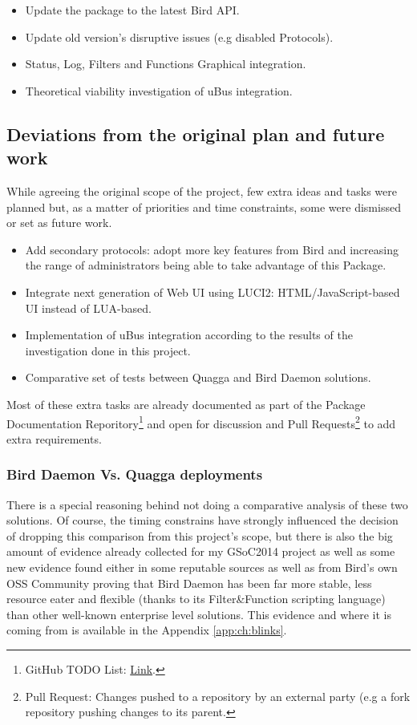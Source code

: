 \begin{itemize}
    \item Update the package to the latest Bird API.
    \item Update old version's disruptive issues (e.g disabled Protocols).
    \item Status, Log, Filters and Functions Graphical integration.
    \item Theoretical viability investigation of uBus integration.
\end{itemize}


\subsection{Deviations from the original plan and future  work}
While agreeing the original scope of the project, few extra ideas and tasks were planned but, as a matter of priorities and time constraints, some were dismissed or set as future work.

\begin{itemize}
    \item Add secondary protocols: adopt more key features from Bird and increasing the range of administrators being able to take advantage of this Package.
    \item Integrate next generation of Web UI using LUCI2: HTML/JavaScript-based UI instead of LUA-based.
    \item Implementation of uBus integration according to the results of the investigation done in this project.
    \item Comparative set of tests between Quagga and Bird Daemon solutions.
\end{itemize}

Most of these extra tasks are already documented as part of the Package Documentation Reporitory\footnote{GitHub TODO List: \href{https://github.com/eloicaso/bgp-bmx6-bird-docn/blob/master/EN/TODO.md}{Link}.} and open for discussion and Pull Requests\footnote{Pull Request: Changes pushed to a repository by an external party (e.g a fork repository pushing changes to its parent.} to add extra requirements.

\subsubsection{Bird Daemon Vs. Quagga deployments}
There is a special reasoning behind not doing a comparative analysis of these two solutions. Of course, the timing constrains have strongly influenced the decision of dropping this comparison from this project's scope, but there is also the big amount of evidence already collected for my GSoC2014 project as well as some new evidence found either in some reputable sources as well as from Bird's own OSS Community proving that Bird Daemon has been far more stable, less resource eater and flexible (thanks to its Filter\&Function scripting language) than other well-known enterprise level solutions. This evidence and where it is coming from is available in the Appendix \ref{app:ch:blinks}.


